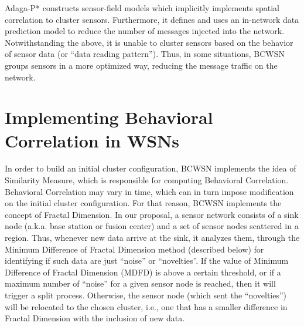\documentclass{acm_proc_article-sp}
\begin{document}

Adaga-P* \cite{MaiaACR2013} constructs sensor-field models which
implicitly implements spatial correlation to cluster sensors. Furthermore, it
defines and uses an in-network data prediction model to reduce the number of
messages injected into the network. Notwithstanding the above, it is unable
to cluster sensors based on the behavior of sensor data (or ``data reading
pattern''). Thus, in some situations, BCWSN groups sensors in a more
optimized way, reducing the message traffic on the network.

\section{Implementing Behavioral Correlation in WSNs}
\label{implementing-bcwsn}

In order to build an initial cluster configuration, BCWSN implements the idea of
Similarity Measure, which is responsible for computing Behavioral Correlation.
Behavioral Correlation may vary in time, which can in turn impose modification
on the initial cluster configuration. For that reason, BCWSN implements the
concept of Fractal Dimension. In our proposal, a sensor network consists of a
sink node (a.k.a. base station or fusion center) and a set of sensor nodes
scattered in a region.
Thus, whenever new data arrive at the sink, it analyzes them, through the
Minimum Difference of Fractal Dimension method (described below) for identifying
if such data are just ``noise'' or ``novelties''. If the value of Minimum
Difference of Fractal Dimension (MDFD) is above a certain threshold, or if a
maximum number of ``noise'' for a given sensor node is reached, then it will
trigger a split process.
Otherwise, the sensor node (which sent the ``novelties'') will be relocated to
the chosen cluster, i.e., one that has a smaller difference in Fractal Dimension
with the inclusion of new data.
\vspace*{-.3cm}
\end{document}
